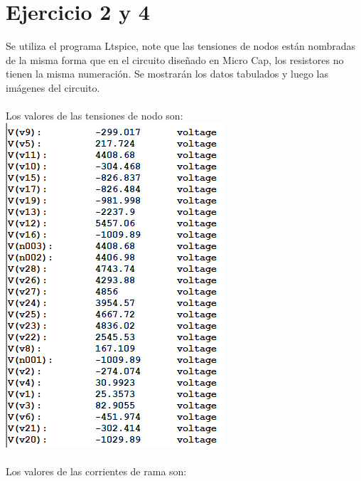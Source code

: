 \documentclass{article}
\begin{document}
\section{Ejercicio 2 y 4}
Se utiliza el programa Ltspice, note que las tensiones de nodos están nombradas de la misma forma que en el circuito diseñado en Micro Cap, los resistores no tienen la misma numeración. Se mostrarán los datos tabulados y luego las imágenes del circuito.\\ \\
Los valores de las tensiones de nodo son:\\ 
\includegraphics[]{images/ltspicetensiones.PNG}\\ \\
Los valores de las corrientes de rama son: \\ \\
\end{document}
